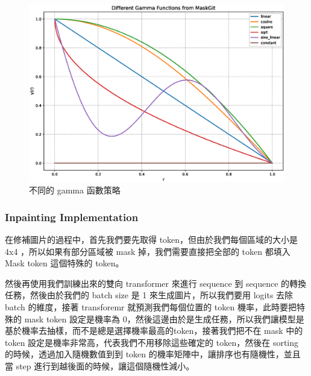 \begin{figure}[h]
    \centering
    \includegraphics[width=\textwidth]{figures/gamma_functions}
    \caption{不同的 gamma 函數策略}
    \label{fig:gamma_functions}
\end{figure}


\subsubsection{Inpainting Implementation}

在修補圖片的過程中，首先我們要先取得 token，但由於我們每個區域的大小是 4x4 ，所以如果有部分區域被 mask 掉，我們需要直接把全部的 token 都填入 Mask token 這個特殊的 token。

然後再使用我們訓練出來的雙向 transformer 來進行 sequence 到 sequence 的轉換任務，然後由於我們的 batch size 是 1 來生成圖片，所以我們要用 logits 去除 batch 的維度，接著 transforemr 就預測我們每個位置的 token 機率，此時要把特殊的 mask token 設定是機率為 0，然後這邊由於是生成任務，所以我們讓模型是基於機率去抽樣，而不是總是選擇機率最高的token，接著我們把不在 mask 中的 token 設定是機率非常高，代表我們不用移除這些確定的 token，然後在 sorting 的時候，透過加入隨機數值到到 token 的機率矩陣中，讓排序也有隨機性，並且當 step 進行到越後面的時候，讓這個隨機性減小。

